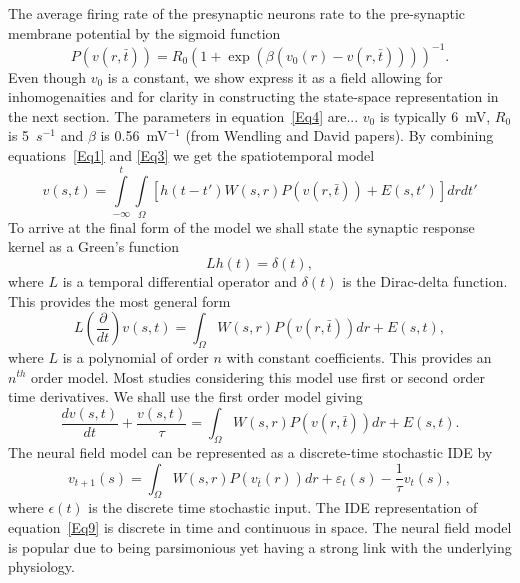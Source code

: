 \documentclass[onecolumn,draftcls]{IEEEtran}
\begin{document}
The average firing rate of the presynaptic neurons rate to the pre-synaptic membrane potential by the sigmoid function
\begin{equation}\label{Eq4}
P\left( {v\left( {r,\bar t} \right)} \right) = {R_0}{\left( {1 + \exp \left( {\beta \left( {{v_0}\left( r \right) - v\left( {r,\bar t} \right)} \right)} \right)} \right)^{ - 1}}.
\end{equation}
Even though $v_0$ is a constant, we show express it as a field allowing for inhomogenaities and for clarity in constructing the state-space representation in the next section. The parameters in equation~\ref{Eq4} are... $v_0$ is typically 6~mV, $R_0$ is 5~$s^{-1}$ and $\beta$ is 0.56~mV$^{-1}$ (from Wendling and David papers). By combining equations~\ref{Eq1} and \ref{Eq3} we get the spatiotemporal model
\begin{equation}\label{Eq5}
v\left(s,t\right) = \int\limits_{-\infty}^t\int\limits_\Omega \left[ h\left(t - t'\right)W\left(s,r\right)P\left( v\left( r,\bar t \right)\right)+E\left(s,t'\right)\right] dr dt'
\end{equation}
To arrive at the final form of the model we shall state the synaptic response kernel as a Green's function
\begin{equation}\label{Eq6}
Lh\left( t \right) = \delta \left( t \right),
\end{equation}
where $L$ is a temporal differential operator and $\delta(t)$ is the Dirac-delta function. This provides the most general form
\begin{equation}\label{Eq7}
L\left( {\frac{\partial }{{dt}}} \right)v\left( {s,t} \right) = \int_\Omega  {W\left( {s,r} \right)P\left( {v\left( {r,\bar t} \right)} \right)dr}  + E\left( {s,t} \right),
\end{equation}
where $L$ is a polynomial of order $n$ with constant coefficients. This provides an $n^{th}$ order model. Most studies considering this model use first or second order time derivatives. We shall use the first order model giving
\begin{equation}\label{Eq8}
\frac{{dv\left( {s,t} \right)}}{{dt}} + \frac{{v\left( {s,t} \right)}}{\tau } = \int_\Omega  {W\left( {s,r} \right)P\left( {v\left( {r,\bar t} \right)} \right)dr}  + E\left( {s,t} \right).
\end{equation}
The neural field model can be represented as a discrete-time stochastic IDE by
\begin{equation}\label{Eq9}
{v_{t + 1}}\left( s \right) = \int_\Omega  {W\left( {s,r} \right)P\left( {{v_{\bar t}}\left( r \right)} \right)dr}  + {\varepsilon _t}\left( s \right) - \frac{1}{\tau }{v_t}\left( s \right),
\end{equation}
where $\epsilon(t)$ is the discrete time stochastic input. The IDE representation of equation~\ref{Eq9} is discrete in time and continuous in space. The neural field model is popular due to being parsimonious yet having a strong link with the underlying physiology.
\end{document}
